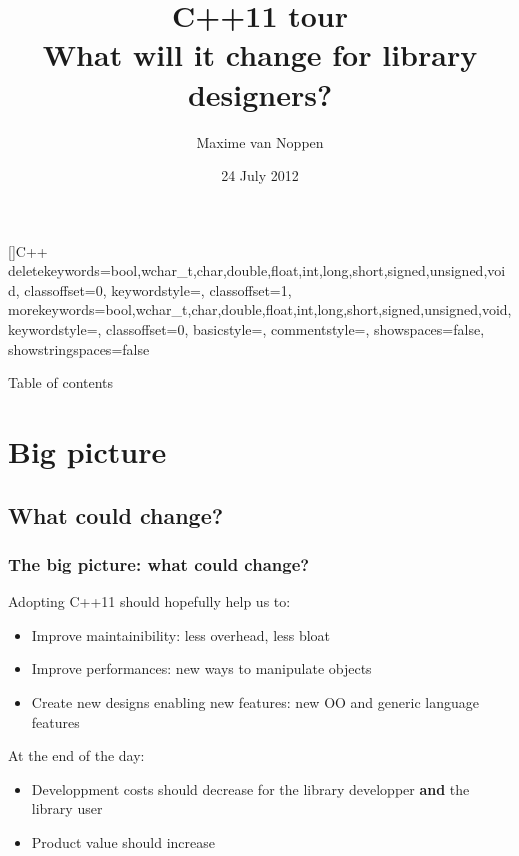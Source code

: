 \documentclass[xcolor=dvipsnames]{beamer}
\title[C++11 tour\hspace{25mm} \insertframenumber/\inserttotalframenumber]{C++11 tour\\What will it change for library designers?}
\author{Maxime van Noppen}
\date{24 July 2012}
\begin{document}

[]{C++}%
  {
    deletekeywords={bool,wchar_t,char,double,float,int,long,short,signed,unsigned,void},
    classoffset=0,
    keywordstyle=\color{orange},
    classoffset=1,
    morekeywords={bool,wchar_t,char,double,float,int,long,short,signed,unsigned,void},
    keywordstyle=\color{blue},
    classoffset=0,
    basicstyle=\footnotesize,
    commentstyle=\color{red},
    showspaces=false,
    showstringspaces=false
  }%



\begin{frame}
\titlepage
\end{frame}

\begin{frame}{Table of contents}
\tableofcontents
\end{frame}

\section{Big picture}
\subsection{What could change?}
\begin{frame}
\frametitle{The big picture: what could change?}

Adopting C++11 should hopefully help us to:

\begin{itemize}
  \item Improve maintainibility: less overhead, less bloat
  \pause
  \item Improve performances: new ways to manipulate objects
  \pause
  \item Create new designs enabling new features: new OO and generic language features
\end{itemize}

\pause
At the end of the day:
\begin{itemize}
  \item Developpment costs should decrease for the library developper \textbf{and} the library user
  \pause
  \item Product value should increase
\end{itemize}
\end{frame}
\end{document}
